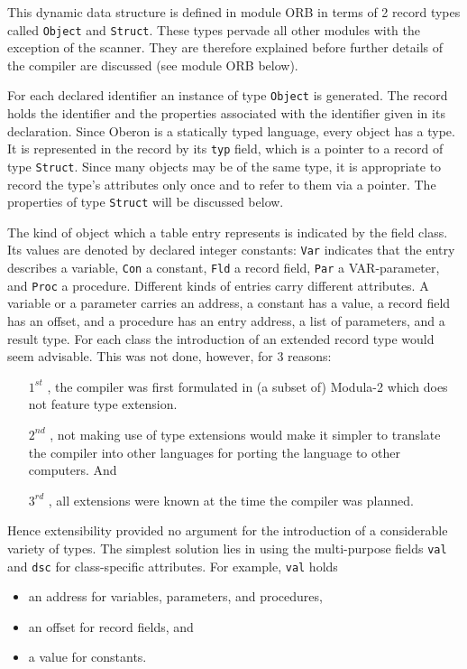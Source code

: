This dynamic data structure is defined in module ORB in terms of 2 record types called \verb|Object|
and \verb|Struct|. These types pervade all other modules with the exception of the scanner. They are
therefore explained before further details of the compiler are discussed (see module ORB below).

For each declared identifier an instance of type \verb|Object| is generated. The record holds the
identifier and the properties associated with the identifier given in its declaration. Since Oberon
is a statically typed language, every object has a type. It is represented in the record by its
\verb|typ| field, which is a pointer to a record of type \verb|Struct|. Since many objects may be of
the same type, it is appropriate to record the type's attributes only once and to refer to them via
a pointer. The properties of type \verb|Struct| will be discussed below.

The kind of object which a table entry represents is indicated by the field class. Its values are
denoted by declared integer constants: \verb|Var| indicates that the entry describes a variable,
\verb|Con| a constant, \verb|Fld| a record field, \verb|Par| a VAR-parameter, and \verb|Proc| a
procedure. Different kinds of entries carry different attributes. A variable or a parameter carries
an address, a constant has a value, a record field has an offset, and a procedure has an entry address,
a list of parameters, and a result type. For each class the introduction of an extended record type
would seem advisable. This was not done, however, for 3 reasons:
\begin{itemize}
  \item[$1^{st}$], the compiler was first formulated in (a subset of) Modula-2 which does not feature
      type extension.
  \item[$2^{nd}$], not making use of type extensions would make it simpler to translate the compiler
      into other languages for porting the language to other computers. And
  \item[$3^{rd}$], all extensions were known at the time the compiler was planned.
\end{itemize}
Hence extensibility provided no argument for the introduction of a considerable variety of types. The
simplest solution lies in using the multi-purpose fields \verb|val| and \verb|dsc| for class-specific
attributes. For example, \verb|val| holds
\begin{itemize}
  \item an address for variables, parameters, and procedures,
  \item an offset for record fields, and
  \item a value for constants.
\end{itemize}

